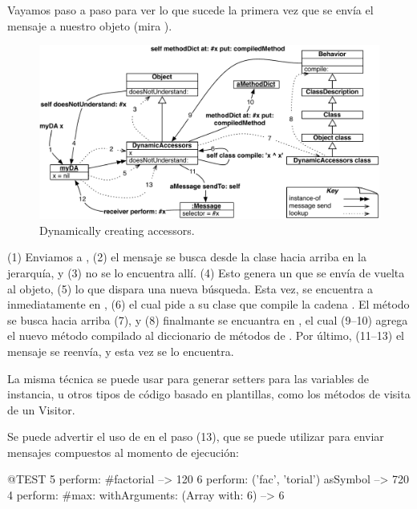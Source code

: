 \documentclass[a4paper,10pt,twoside]{book}
\begin{document}
Vayamos paso a paso para ver lo que sucede la primera vez que se envía
el mensaje  a nuestro objeto (mira ).

\begin{figure}[ht]\centering
        \includegraphics[width=\linewidth]{DynamicAccessors}
        \caption{Dynamically creating accessors.}
\end{figure}

(1) Enviamos  a , (2) el mensaje se busca desde la
clase hacia arriba en la jerarquía, y (3) no se lo encuentra allí.
(4) Esto genera un  que se envía de
vuelta al objeto, (5) lo que dispara una nueva búsqueda.  Esta vez, se
encuentra a  inmediatamente en
, (6) el cual pide a su clase que compile la
cadena .  El método  se busca hacia arriba
(7), y (8) finalmante se encuantra en , el cual (9--10)
agrega el nuevo método compilado al diccionario de métodos de
.  Por último, (11--13) el mensaje se reenvía, y
esta vez se lo encuentra.

La misma técnica se puede usar para generar setters para las variables
de instancia, u otros tipos de código basado en plantillas, como los
métodos de visita de un Visitor.

Se puede advertir el uso de  en el paso
(13), que se puede utilizar para enviar mensajes compuestos al momento
de ejecución:
\begin{code}{@TEST}
5 perform: #factorial                                             --> 120
6 perform: ('fac', 'torial') asSymbol                       --> 720
4 perform: #max: withArguments: (Array with: 6) --> 6
\end{code}
\end{document}
